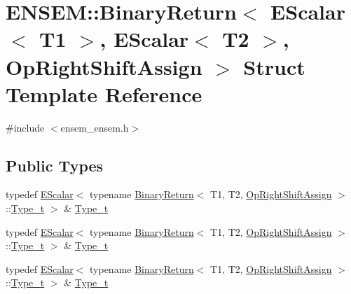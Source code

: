 \hypertarget{structENSEM_1_1BinaryReturn_3_01EScalar_3_01T1_01_4_00_01EScalar_3_01T2_01_4_00_01OpRightShiftAssign_01_4}{}\section{E\+N\+S\+EM\+:\+:Binary\+Return$<$ E\+Scalar$<$ T1 $>$, E\+Scalar$<$ T2 $>$, Op\+Right\+Shift\+Assign $>$ Struct Template Reference}
\label{structENSEM_1_1BinaryReturn_3_01EScalar_3_01T1_01_4_00_01EScalar_3_01T2_01_4_00_01OpRightShiftAssign_01_4}


{\ttfamily \#include $<$ensem\+\_\+ensem.\+h$>$}

\subsection*{Public Types}
\begin{DoxyCompactItemize}
\item 
typedef \mbox{\hyperlink{classENSEM_1_1EScalar}{E\+Scalar}}$<$ typename \mbox{\hyperlink{structENSEM_1_1BinaryReturn}{Binary\+Return}}$<$ T1, T2, \mbox{\hyperlink{structENSEM_1_1OpRightShiftAssign}{Op\+Right\+Shift\+Assign}} $>$\+::\mbox{\hyperlink{structENSEM_1_1BinaryReturn_3_01EScalar_3_01T1_01_4_00_01EScalar_3_01T2_01_4_00_01OpRightShiftAssign_01_4_a2b07316f5d115b01017222f13782ce26}{Type\+\_\+t}} $>$ \& \mbox{\hyperlink{structENSEM_1_1BinaryReturn_3_01EScalar_3_01T1_01_4_00_01EScalar_3_01T2_01_4_00_01OpRightShiftAssign_01_4_a2b07316f5d115b01017222f13782ce26}{Type\+\_\+t}}
\item 
typedef \mbox{\hyperlink{classENSEM_1_1EScalar}{E\+Scalar}}$<$ typename \mbox{\hyperlink{structENSEM_1_1BinaryReturn}{Binary\+Return}}$<$ T1, T2, \mbox{\hyperlink{structENSEM_1_1OpRightShiftAssign}{Op\+Right\+Shift\+Assign}} $>$\+::\mbox{\hyperlink{structENSEM_1_1BinaryReturn_3_01EScalar_3_01T1_01_4_00_01EScalar_3_01T2_01_4_00_01OpRightShiftAssign_01_4_a2b07316f5d115b01017222f13782ce26}{Type\+\_\+t}} $>$ \& \mbox{\hyperlink{structENSEM_1_1BinaryReturn_3_01EScalar_3_01T1_01_4_00_01EScalar_3_01T2_01_4_00_01OpRightShiftAssign_01_4_a2b07316f5d115b01017222f13782ce26}{Type\+\_\+t}}
\item 
typedef \mbox{\hyperlink{classENSEM_1_1EScalar}{E\+Scalar}}$<$ typename \mbox{\hyperlink{structENSEM_1_1BinaryReturn}{Binary\+Return}}$<$ T1, T2, \mbox{\hyperlink{structENSEM_1_1OpRightShiftAssign}{Op\+Right\+Shift\+Assign}} $>$\+::\mbox{\hyperlink{structENSEM_1_1BinaryReturn_3_01EScalar_3_01T1_01_4_00_01EScalar_3_01T2_01_4_00_01OpRightShiftAssign_01_4_a2b07316f5d115b01017222f13782ce26}{Type\+\_\+t}} $>$ \& \mbox{\hyperlink{structENSEM_1_1BinaryReturn_3_01EScalar_3_01T1_01_4_00_01EScalar_3_01T2_01_4_00_01OpRightShiftAssign_01_4_a2b07316f5d115b01017222f13782ce26}{Type\+\_\+t}}
\end{DoxyCompactItemize}


